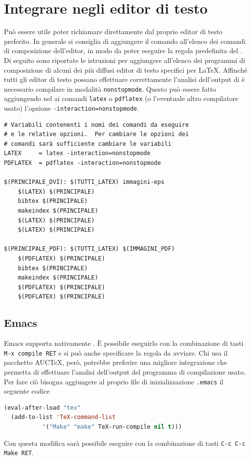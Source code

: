 \cleardoublepage{}
\chapter{Integrare  negli editor di testo}
\label{cha:editor}

Può essere utile poter richiamare  direttamente dal proprio
editor di testo preferito.  In generale si consiglia di aggiungere il comando
 all'elenco dei comandi di composizione dell'editor, in modo da
poter eseguire la regola predefinita del .  Di seguito sono
riportate le istruzioni per aggiungere  all'elenco dei programmi
di composizione di alcuni dei più diffusi editor di testo specifici per
\LaTeX{}.  Affinché tutti gli editor di testo possano effettuare correttamente
l'analisi dell'output di  è necessario compilare in modalità
\texttt{nonstopmode}.  Questo può essere fatto aggiungendo nel
 ai comandi \texttt{latex} o \texttt{pdflatex} (o
l'eventuale altro compilatore usato) l'opzione
\texttt{-interaction=nonstopmode}.
\begin{lstlisting}
# Variabili contenenti i nomi dei comandi da eseguire
# e le relative opzioni.  Per cambiare le opzioni dei
# comandi sarà sufficiente cambiare le variabili
LATEX     = latex -interaction=nonstopmode
PDFLATEX  = pdflatex -interaction=nonstopmode

$(PRINCIPALE_DVI): $(TUTTI_LATEX) immagini-eps
	$(LATEX) $(PRINCIPALE)
	bibtex $(PRINCIPALE)
	makeindex $(PRINCIPALE)
	$(LATEX) $(PRINCIPALE)
	$(LATEX) $(PRINCIPALE)

$(PRINCIPALE_PDF): $(TUTTI_LATEX) $(IMMAGINI_PDF)
	$(PDFLATEX) $(PRINCIPALE)
	bibtex $(PRINCIPALE)
	makeindex $(PRINCIPALE)
	$(PDFLATEX) $(PRINCIPALE)
	$(PDFLATEX) $(PRINCIPALE)
\end{lstlisting}

\section{Emacs}
\label{sec:emacs}

Emacs supporta nativamente .  È possibile eseguirlo con la
combinazione di tasti \texttt{M-x compile RET} e si può anche specificare la
regola da avviare.  Chi usa il pacchetto AUC\TeX{},
però, potrebbe preferire una migliore integrazione che permetta di effettuare
l'analisi dell'output del programma di compilazione usato.  Per fare ciò bisogna
aggiungere al proprio file di inizializzazione \texttt{.emacs} il seguente
codice
\begin{lstlisting}[language=lisp,morekeywords={eval-after-load,add-to-list}]
(eval-after-load "tex"
  (add-to-list 'TeX-command-list
	       '("Make" "make" TeX-run-compile nil t)))
\end{lstlisting}
Con questa modifica sarà possibile eseguire  con la combinazione
di tasti \texttt{C-c C-c Make RET}.

